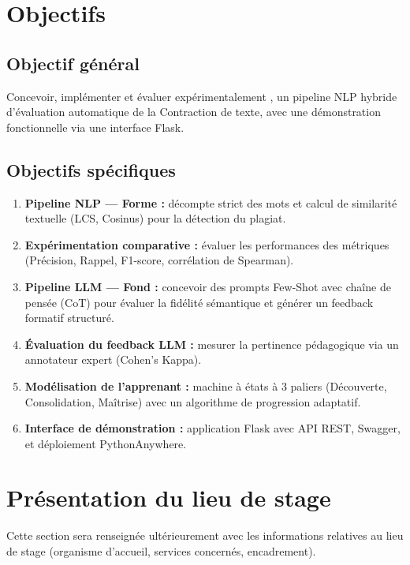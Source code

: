 \section*{Objectifs}

\subsection*{Objectif général}

Concevoir, implémenter et évaluer expérimentalement \AZIZA, un pipeline NLP hybride d'évaluation automatique de la Contraction de texte, avec une démonstration fonctionnelle via une interface Flask.

\subsection*{Objectifs spécifiques}

\begin{enumerate}
    \item \textbf{Pipeline NLP — Forme :} décompte strict des mots et calcul de similarité textuelle (LCS, Cosinus) pour la détection du plagiat.
    \item \textbf{Expérimentation comparative :} évaluer les performances des métriques (Précision, Rappel, F1-score, corrélation de Spearman).
    \item \textbf{Pipeline LLM — Fond :} concevoir des prompts Few-Shot avec chaîne de pensée (CoT) pour évaluer la fidélité sémantique et générer un feedback formatif structuré.
    \item \textbf{Évaluation du feedback LLM :} mesurer la pertinence pédagogique via un annotateur expert (Cohen's Kappa).
    \item \textbf{Modélisation de l'apprenant :} machine à états à 3 paliers (Découverte, Consolidation, Maîtrise) avec un algorithme de progression adaptatif.
    \item \textbf{Interface de démonstration :} application Flask avec API REST, Swagger, et déploiement PythonAnywhere.
\end{enumerate}

\section*{Présentation du lieu de stage}


\vspace{2cm}
\begin{tcolorbox}[colback=gray!5,colframe=gray!40,title=\textbf{À compléter}]
Cette section sera renseignée ultérieurement avec les informations relatives au lieu de stage (organisme d'accueil, services concernés, encadrement).
\end{tcolorbox}
\vspace{1cm}

